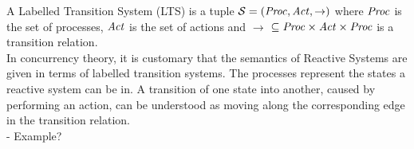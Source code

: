 %
\begin{isabellebody}%
%
%
\isadelimtheory
%
\endisadelimtheory
%
\isatagtheory
%
\endisatagtheory
{\isafoldtheory}%
%
\isadelimtheory
%
\endisadelimtheory
%
\isadelimdocument
%
\endisadelimdocument
%
\isatagdocument
%
\isamarkuptrue%
%
\endisatagdocument
{\isafolddocument}%
%
\isadelimdocument
%
\endisadelimdocument
%
\begin{isamarkuptext}%
\label{sec:LTS}%
\end{isamarkuptext}\isamarkuptrue%
%
\isadelimdocument
%
\endisadelimdocument
%
\isatagdocument
%
\isamarkuptrue%
%
\endisatagdocument
{\isafolddocument}%
%
\isadelimdocument
%
\endisadelimdocument
%
\begin{isamarkuptext}%
A Labelled Transition System (LTS) is a tuple $\mathcal{S} = (\mathit{Proc}, \mathit{Act}, \rightarrow)$ where $\mathit{Proc}$ is the set of processes, 
$\mathit{Act}$ is the set of actions and $\rightarrow$ $\subseteq \mathit{Proc} \times \mathit{Act} \times \mathit{Proc}$ is a transition relation.\\

In concurrency theory, it is customary that the semantics of Reactive Systems are given in terms of labelled transition systems.
The processes represent the states a reactive system can be in. A transition of one state into another, 
caused by performing an action, can be understood as moving along the corresponding edge in the transition relation. \\

- Example?\\


\end{isamarkuptext}
\end{isabellebody}
